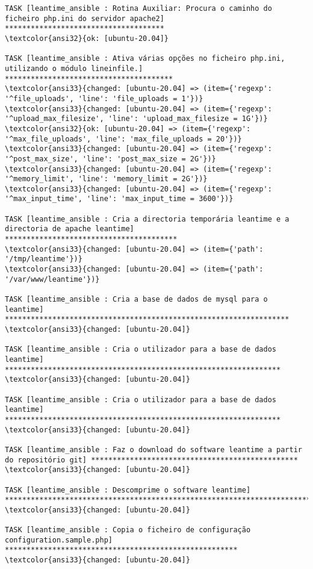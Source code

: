 \documentclass{scrartcl}
\begin{document}
\begin{Verbatim}
TASK [leantime_ansible : Rotina Auxiliar: Procura o caminho do ficheiro php.ini do servidor apache2] *************************************
\textcolor{ansi32}{ok: [ubuntu-20.04]}

TASK [leantime_ansible : Ativa várias opções no ficheiro php.ini, utilizando o módulo lineinfile.] ***************************************
\textcolor{ansi33}{changed: [ubuntu-20.04] => (item={'regexp': '^file_uploads', 'line': 'file_uploads = 1'})}
\textcolor{ansi33}{changed: [ubuntu-20.04] => (item={'regexp': '^upload_max_filesize', 'line': 'upload_max_filesize = 1G'})}
\textcolor{ansi32}{ok: [ubuntu-20.04] => (item={'regexp': '^max_file_uploads', 'line': 'max_file_uploads = 20'})}
\textcolor{ansi33}{changed: [ubuntu-20.04] => (item={'regexp': '^post_max_size', 'line': 'post_max_size = 2G'})}
\textcolor{ansi33}{changed: [ubuntu-20.04] => (item={'regexp': '^memory_limit', 'line': 'memory_limit = 2G'})}
\textcolor{ansi33}{changed: [ubuntu-20.04] => (item={'regexp': '^max_input_time', 'line': 'max_input_time = 3600'})}

TASK [leantime_ansible : Cria a directoria temporária leantime e a directoria de apache leantime] ****************************************
\textcolor{ansi33}{changed: [ubuntu-20.04] => (item={'path': '/tmp/leantime'})}
\textcolor{ansi33}{changed: [ubuntu-20.04] => (item={'path': '/var/www/leantime'})}

TASK [leantime_ansible : Cria a base de dados de mysql para o leantime] ******************************************************************
\textcolor{ansi33}{changed: [ubuntu-20.04]}

TASK [leantime_ansible : Cria o utilizador para a base de dados leantime] ****************************************************************
\textcolor{ansi33}{changed: [ubuntu-20.04]}

TASK [leantime_ansible : Cria o utilizador para a base de dados leantime] ****************************************************************
\textcolor{ansi33}{changed: [ubuntu-20.04]}

TASK [leantime_ansible : Faz o download do software leantime a partir do repositório git] ************************************************
\textcolor{ansi33}{changed: [ubuntu-20.04]}

TASK [leantime_ansible : Descomprime o software leantime] ********************************************************************************
\textcolor{ansi33}{changed: [ubuntu-20.04]}

TASK [leantime_ansible : Copia o ficheiro de configuração configuration.sample.php] ******************************************************
\textcolor{ansi33}{changed: [ubuntu-20.04]}


\end{Verbatim}
\end{document}
